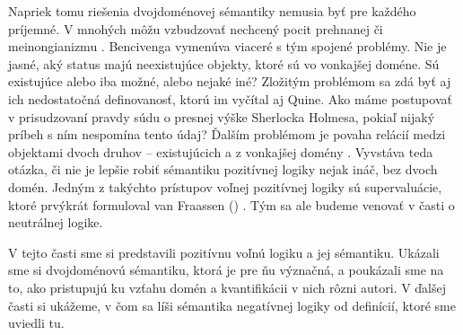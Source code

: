 \documentclass[12pt, letterpaper]{article}
\begin{document}
Napriek tomu riešenia dvojdoménovej sémantiky nemusia byť pre každého príjemné. V mnohých môžu vzbudzovať nechcený pocit prehnanej  či meinongianizmu \parencites[]{sep-logic-free}. Bencivenga vymenúva viaceré s tým spojené problémy. Nie je jasné, aký status majú neexistujúce objekty, ktoré sú vo vonkajšej doméne. Sú existujúce alebo iba možné, alebo nejaké iné? Zložitým problémom sa zdá byť aj ich nedostatočná definovanosť, ktorú im vyčítal aj Quine. Ako máme postupovať v prisudzovaní pravdy súdu o presnej výške Sherlocka Holmesa, pokiaľ nijaký príbeh s ním nespomína tento údaj? Ďalším problémom je povaha relácií medzi objektami dvoch druhov -- existujúcich a z vonkajšej domény \parencites[167]{Bencivenga2002}[57]{Findlay1933}. Vyvstáva teda otázka, či nie je lepšie robiť sémantiku pozitívnej logiky nejak ináč, bez dvoch domén. Jedným z takýchto prístupov voľnej pozitívnej logiky sú supervaluácie, ktoré prvýkrát formuloval van Fraassen (\citeyear{Fraassen}) \parencites[158--159]{Dumitru2015}[18]{Dvorak}{sep-logic-free}. Tým sa ale budeme venovať v časti o neutrálnej logike.\par

V tejto časti sme si predstavili pozitívnu voľnú logiku a jej sémantiku. Ukázali sme si dvojdoménovú sémantiku, ktorá je pre ňu význačná, a poukázali sme na to, ako pristupujú ku vzťahu domén a kvantifikácii v nich rôzni autori. V ďalšej časti si ukážeme, v čom sa líši sémantika negatívnej logiky od definícií, ktoré sme uviedli tu. 
\end{document}
